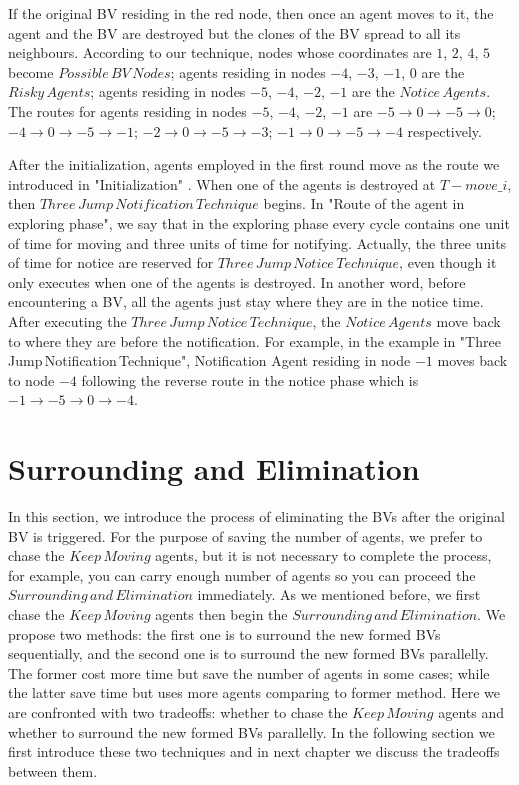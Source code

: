 If the original BV residing in the red node, then once an agent moves to it, the agent and the BV are destroyed but the clones of the BV spread to all its neighbours. According to our technique, nodes whose coordinates are $1$, $2$, $4$, $5$ become $Possible\,BV\,Nodes$; agents residing in nodes $-4$, $-3$, $-1$, $0$ are the $Risky\, Agents$; agents residing in nodes $-5$, $-4$, $-2$, $-1$ are the $Notice\,Agents$. The routes for agents residing in nodes $-5$, $-4$, $-2$, $-1$ are $-5{\rightarrow}0{\rightarrow}-5{\rightarrow}0$; $-4{\rightarrow}0{\rightarrow}-5{\rightarrow}-1$; $-2{\rightarrow}0{\rightarrow}-5{\rightarrow}-3$; $-1{\rightarrow}0{\rightarrow}-5{\rightarrow}-4$ respectively.


After the initialization, agents employed in the first round move as the route we introduced in "Initialization" . When one of the agents is destroyed at $T-{move\_i}$, then $Three\,Jump\,Notification\,Technique$ begins. In "Route of the agent in exploring phase", we say that in the exploring phase every cycle contains one unit of time for moving and three units of time for notifying. Actually, the three units of time for notice are reserved for $Three\,Jump\, Notice\,Technique$, even though it only executes when one of the agents is destroyed. In another word, before encountering a BV, all the agents just stay where they are in the notice time.
After executing the $Three\,Jump\,Notice\,Technique$, the $Notice\,Agents$ move back to where they are before the notification. For example, in the example in "Three\,Jump\,Notification\,Technique", Notification Agent residing in node $-1$ moves back to node $-4$ following the reverse route in the notice phase which is $-1{\rightarrow}-5{\rightarrow}0{\rightarrow}-4$. 

\section{Surrounding and Elimination}
In this section, we introduce the process of eliminating the BVs after the original BV is triggered. For the purpose of saving the number of agents, we prefer to chase the $Keep\,Moving$ agents, but it is not necessary to complete the process, for example, you can carry enough number of agents so you can proceed the $Surrounding\,and\,Elimination$ immediately. As we mentioned before, we first chase the $Keep\,Moving$ agents then begin the $Surrounding\,and\,Elimination$. We propose two methods: the first one is to surround the new formed BVs sequentially, and the second one is to surround the new formed BVs parallelly. The former cost more time but save the number of agents in some cases; while the latter save time but uses more agents comparing to former method. Here we are confronted with two tradeoffs: whether to chase the $Keep\,Moving$ agents and whether to surround the new formed BVs parallelly. In the following section we first introduce these two techniques and in next chapter we discuss the tradeoffs between them.


